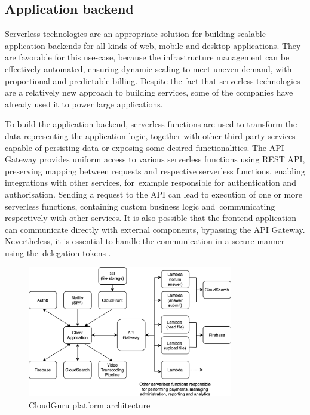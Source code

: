 \subsection{Application backend} \label{chapter:serverless-example-application-backend}

Serverless technologies are an appropriate solution for building scalable application backends for all kinds of web, mobile and desktop applications. They are favorable for this use-case, because the infrastructure management can be effectively automated, ensuring dynamic scaling to meet uneven demand, with proportional and predictable billing. Despite the fact that serverless technologies are a relatively new approach to building services, some of the companies have already used it to power large applications.

To build the application backend, serverless functions are used to transform the data representing the application logic, together with other third party services capable of persisting data or exposing some desired functionalities. The API Gateway provides uniform access to various serverless functions using REST API, preserving mapping between requests and respective serverless functions, enabling integrations with other services, for~example responsible for authentication and authorisation. Sending a request to the API can lead to execution of one or more serverless functions, containing custom business logic and~communicating respectively with other services. It is also possible that the frontend application can communicate directly with external components, bypassing the API Gateway. Nevertheless, it is essential to handle the communication in a secure manner using the~delegation tokens \cite{ServerlessArchitectureOnAWS}.

\begin{figure}[h]
    \centering
    \includegraphics[width=0.8\textwidth]{assets/02-serverless/CloudGuruArchitecture.png}
    \caption{CloudGuru platform architecture}
    \label{fig:cloudguru-architecture-diagram}
\end{figure}

